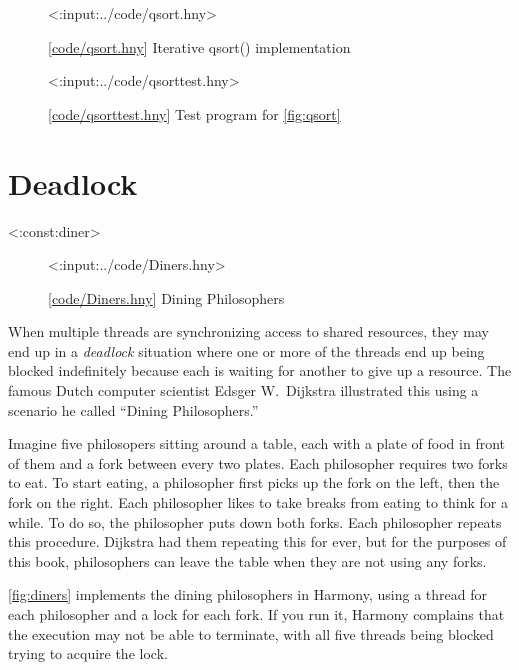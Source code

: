 \documentclass{report}
\newcommand{\harmonylink}[1]{%
[\href{https://harmony.cs.cornell.edu/#1}{\underline{#1}}]%
}
\newenvironment{code}{
\tcolorbox
}{
\endtcolorbox
}
\begin{document}
{\begin{figure}
\begin{code}
<{:input:../code/qsort.hny}>
\end{code}
\caption{\harmonylink{code/qsort.hny} Iterative qsort() implementation}
\label{fig:qsort}
\end{figure}

\begin{figure}
\begin{code}
<{:input:../code/qsorttest.hny}>
\end{code}
\caption{\harmonylink{code/qsorttest.hny} Test program for \autoref{fig:qsort}}
\label{fig:qsorttest}
\end{figure}

\chapter{Deadlock}
\label{ch:deadlock}
%

<{:const:diner}>

%

\begin{figure}
\begin{code}
<{:input:../code/Diners.hny}>
\end{code}
\caption{\harmonylink{code/Diners.hny} Dining Philosophers}
\label{fig:diners}
\end{figure}

When multiple threads are synchronizing access to shared resources, they
may end up in a \emph{deadlock} situation where one or more of the threads
end up being blocked indefinitely because each is waiting for another to give
up a resource.
The famous Dutch computer scientist Edsger W.~Dijkstra illustrated this using
a scenario he called ``Dining Philosophers.''
%

Imagine five philosopers sitting around a table, each with a plate of food in
front of them and a fork between every two plates.  Each philosopher requires
two forks to eat.  To start eating, a philosopher first picks up the fork on
the left, then the fork on the right.  Each philosopher likes to take breaks
from eating to think for a while.  To do so, the philosopher puts down both
forks.  Each philosopher repeats this procedure.  Dijkstra had them repeating
this for ever, but for the purposes of this book, philosophers can leave
the table when they are not using any forks.

\autoref{fig:diners} implements the dining philosophers in Harmony, using a
thread for each philosopher and a lock for each fork.  If you
run it, Harmony complains that the execution may not be able to terminate,
with all five threads being blocked trying to acquire the lock.

}
\end{document}
